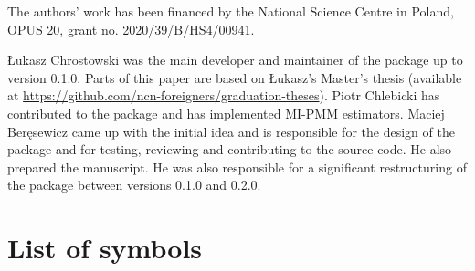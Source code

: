 \documentclass[
]{jss}
\begin{document}
The authors' work has been financed by the National Science Centre in
Poland, OPUS 20, grant no. 2020/39/B/HS4/00941.

Łukasz Chrostowski was the main developer and maintainer of the package
up to version 0.1.0. Parts of this paper are based on Łukasz's Master's
thesis (available at
\url{https://github.com/ncn-foreigners/graduation-theses}). Piotr
Chlebicki has contributed to the package and has implemented MI-PMM
estimators. Maciej Beręsewicz came up with the initial idea and is
responsible for the design of the package and for testing, reviewing and
contributing to the source code. He also prepared the manuscript. He was
also responsible for a significant restructuring of the package between
versions 0.1.0 and 0.2.0.

\clearpage

\appendix

\section{List of symbols}\label{list-of-symbols}
\end{document}
